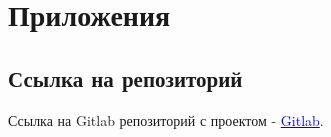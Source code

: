 \section*{Приложения}

\subsection*{Ссылка на репозиторий}

Ссылка на Gitlab репозиторий с проектом - \href{https://gitlab.com/Ch0p1k3/papams-nft-discord-bot}{\textcolor{blue}{Gitlab}}.
